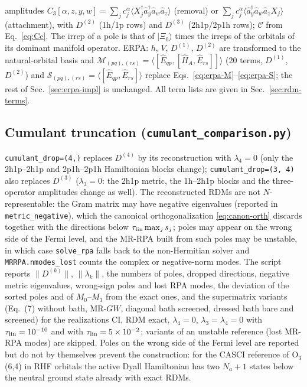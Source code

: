 \documentclass[11pt,a4paper]{article}
\newcommand{\ket}[1]{|#1\rangle}
\newcommand{\braket}[1]{\langle#1\rangle}
\newcommand{\code}[1]{\texttt{#1}}
\begin{document}
amplitudes $C_3[\alpha,z,y,w]=\sum_jc^{\alpha}_j\braket{X_j^\dagger\hat a_y^\dagger\hat a_w\hat a_z}$
(removal) or $\sum_jc^{\alpha}_j\braket{\hat a_y^\dagger\hat a_w\hat a_z X_j}$
(attachment), with $D^{(2)}$ (1h/1p rows) and $D^{(3)}$ (2h1p/2p1h rows);
$\mathcal C$ from Eq.~\eqref{eq:Cc}.  The irrep of a pole is that of
$\ket{\Xi_0}$ times the irreps of the orbitals of its dominant manifold
operator.  ERPA: $h$, $V$, $D^{(1)}$, $D^{(2)}$ are transformed to the
natural-orbital basis and
$\mathcal M_{(pq),(rs)}=\braket{[\hat E_{qp},[\hat H_A,\hat E_{rs}]]}$ (20 terms,
$D^{(1)}$, $D^{(2)}$) and $\mathcal S_{(pq),(rs)}=\braket{[\hat E_{qp},\hat E_{rs}]}$
replace Eqs.~\eqref{eq:erpa-M}--\eqref{eq:erpa-S}; the rest of
Sec.~\ref{sec:erpa-impl} is unchanged.  All term lists are given in
Sec.~\ref{sec:rdm-terms}.

\subsection{Cumulant truncation (\code{cumulant\_comparison.py})}

\code{cumulant\_drop=(4,)} replaces $D^{(4)}$ by its reconstruction with
$\lambda_4=0$ (only the 2h1p--2h1p and 2p1h--2p1h Hamiltonian blocks
change); \code{cumulant\_drop=(3, 4)} also replaces $D^{(3)}$
($\lambda_3=0$: the 2h1p metric, the 1h--2h1p blocks and the three-operator
amplitudes change as well).  The reconstructed RDMs are not
$N$-representable: the Gram matrix may have negative eigenvalues (reported
in \code{metric\_negative}), which the canonical orthogonalization
\eqref{eq:canon-orth} discards together with the directions below
$\tau_{\rm lin}\max_js_j$; poles may appear on the wrong side of the Fermi
level, and the MR-RPA built from such poles may be unstable, in which case
\code{solve\_rpa} falls back to the non-Hermitian solver and
\code{MRRPA.nmodes\_lost} counts the complex or negative-norm modes.  The
script reports $\|D^{(k)}\|$, $\|\lambda_k\|$, the numbers of poles,
dropped directions, negative metric eigenvalues, wrong-sign poles and lost
RPA modes, the deviation of the sorted poles and of $M_0$--$M_3$ from the
exact ones, and the supermatrix variants (Eq.~(7) without bath, MR-$GW$,
diagonal bath screened, dressed bath bare and screened) for the
realizations CI, RDM exact, $\lambda_4=0$, $\lambda_3=\lambda_4=0$ with
$\tau_{\rm lin}=10^{-10}$ and with $\tau_{\rm lin}=5\times10^{-2}$; variants of
an unstable reference (lost MR-RPA modes) are skipped.  Poles on the wrong
side of the Fermi level are reported but do not by themselves prevent the
construction: for the CASCI reference of O$_3$(6,4) in RHF orbitals the
active Dyall Hamiltonian has two $N_a+1$ states below the neutral ground
state already with exact RDMs.
\end{document}
